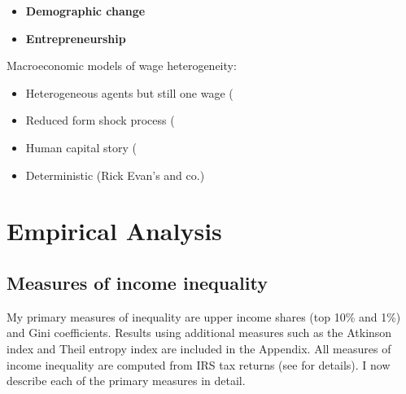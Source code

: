 \documentclass[11pt]{article}
\theoremstyle{definition}
\numberwithin{equation}{section}
\begin{document}
\begin{itemize}
	\item {\bf Demographic change}
	\cite{heckman1998explaining}

	\item {\bf Entrepreneurship}
	\cite{bakija2012jobs}	

\end{itemize}


Macroeconomic models of wage heterogeneity:
\begin{itemize}
	\item Heterogeneous agents but still one wage (\cite{krusell1998income}
	\item Reduced form shock process (\cite{storesletten2004consumption}
	\item Human capital story (\cite{guvenen2010quantitative}
	\item Deterministic (Rick Evan's and co.)
\end{itemize}

\section{Empirical Analysis}

\subsection{Measures of income inequality}
My primary measures of inequality are upper income shares (top 10\%  and 1\%) and Gini coefficients. Results using additional measures such as the Atkinson index and Theil entropy index are included in the Appendix. All measures of income inequality are computed from IRS tax returns (see \cite{frank2009inequality} for details). I now describe each of the primary measures in detail. 
\end{document}
